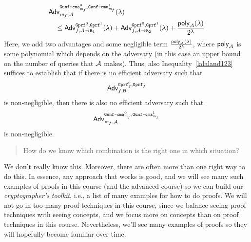 \documentclass[a4paper,table,dvipsnames]{article}
\theoremstyle{definition}
\newcommand{\M}[1]{\ensuremath{\text{\texttt{#1}}}}
\renewcommand{\O}[1]{\ensuremath{\mathsf{#1}}}
\newcommand{\pcvar}[1]{\ensuremath{\mathit{#1}}}
\newcommand{\m}{\pcvar{m}} %
\begin{document}
\begin{align}
   \notag&\mathsf{Adv}^{\M{Gunf\text{-}cma}_{\m_f}^0,\M{Gunf\text{-}cma}_{\m_f}^1}_{\m_f,\adv}(\lambda)\\
   \label{lalaland123}&\quad\leq\mathsf{Adv}^{\M{Gprf}^0,\M{Gprf}^1}_{f,\adv\rightarrow\M{R}_1}(\lambda)+\mathsf{Adv}^{\M{Gprf}^0,\M{Gprf}^1}_{f,\adv\rightarrow\M{R}_2}(\lambda)+\frac{\O{poly}_{\adv}(\lambda)}{2^\lambda}
\end{align}
Here, we add two advantages and some negligible term $\frac{\O{poly}_{\adv}(\lambda)}{2^\lambda}$, where $\O{poly}_{\adv}$ is
some polynomial which depends on the adversary (in this case an upper bound on the number of queries that $\mathcal{A}$ makes).
Thus, also Inequality~\ref{lalaland123} suffices to establish that if there is no efficient adversary such that 
\[\mathsf{Adv}^{\M{Gprf}_f^0,\M{Gprf}_f^1}_{f,\bdv}\] is non-negligible, then there is also no efficient adversary such
that \[\mathsf{Adv}^{\M{Gunf\text{-}cma}_{\m_f}^0,\M{Gunf\text{-}cma}_{\m_f}^1}_{\m_f,\adv}\] is non-negligible.

\begin{quote}
How do we know which combination is the right one in which situation?
\end{quote}

We don't really know this. Moreover, there are
often more than one right way to do this. In essence, any approach that works is good, and we will see many such
examples of proofs in this course (and the advanced course) so we can build our \emph{cryptographer's toolkit}, i.e., 
a list of many examples for how to do proofs. We will not go in too many proof techniques in this course, since we
balance seeing proof techniques with seeing concepts, and we focus more on concepts than on proof techniques in this
course. Nevertheless, we'll see many examples of proofs so they will hopefully become familiar over time.
\end{document}
